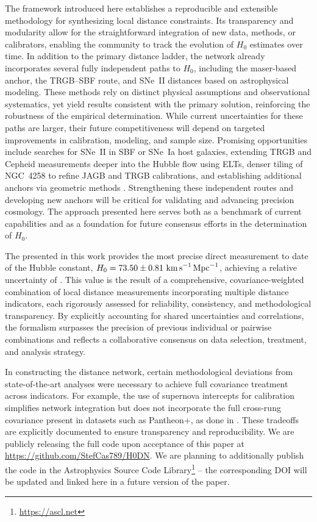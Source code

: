 The {\DN} framework introduced here establishes a reproducible and extensible methodology for synthesizing local distance constraints. Its transparency and modularity allow for the straightforward integration of new data, methods, or calibrators, enabling the community to track the evolution of $H_0$ estimates over time. In addition to the primary distance ladder, the network already incorporates several fully independent paths to $H_0$, including the maser-based anchor, the TRGB–SBF route, and SNe~II distances based on astrophysical modeling. These methods rely on distinct physical assumptions and observational systematics, yet yield results consistent with the primary solution, reinforcing the robustness of the empirical determination. While current uncertainties for these paths are larger, their future competitiveness will depend on targeted improvements in calibration, modeling, and sample size. Promising opportunities include searches for SNe~II in SBF or SNe~Ia host galaxies, extending TRGB and Cepheid measurements deeper into the Hubble flow using ELTs, denser tiling of NGC~4258 to refine JAGB and TRGB calibrations, and establishing additional anchors via geometric methods \citep[e.g., using population-II pulsating stars calibrated by parallax, e.g.,][]{2025arXiv250916331L}. Strengthening these independent routes and developing new anchors will be critical for validating and advancing precision cosmology. The approach presented here serves both as a benchmark of current capabilities and as a foundation for future consensus efforts in the determination of $H_0$.

The {\DN} presented in this work provides the most precise direct measurement to date of the Hubble constant, $H_0 = 73.50 \pm 0.81 \, \,{\rm km\,s}^{-1}{\rm\,Mpc}^{-1}$, achieving a relative uncertainty of {\Hrelerrorbase}. This value is the result of a comprehensive, covariance-weighted combination of local distance measurements incorporating multiple distance indicators, each rigorously assessed for reliability, consistency, and methodological transparency. By explicitly accounting for shared uncertainties and correlations, the {\DN} formalism surpasses the precision of previous individual or pairwise combinations and reflects a collaborative consensus on data selection, treatment, and analysis strategy.

In constructing the distance network, certain methodological deviations from state-of-the-art analyses were necessary to achieve full covariance treatment across indicators. For example, the use of supernova intercepts for calibration simplifies network integration but does not incorporate the full cross-rung covariance present in datasets such as Pantheon+, as done in \citet{2022ApJ...934L...7R}. These tradeoffs are explicitly documented to ensure transparency and reproducibility. We are publicly releasing the full {\DN} code upon acceptance of this paper at \url{https://github.com/StefCas789/H0DN}. We are planning to additionally publish the code in the Astrophysics Source Code Library\footnote{\url{https://ascl.net}} -- the corresponding DOI will be updated and linked here in a future version of the paper.

